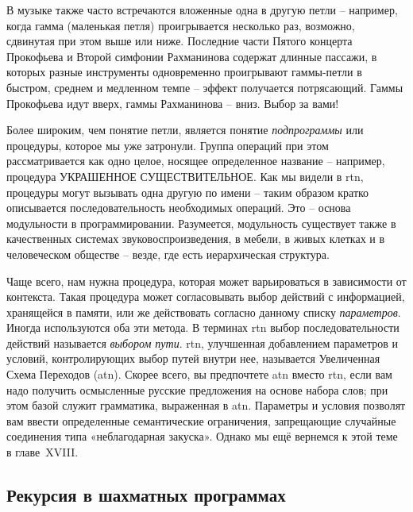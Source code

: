 \documentclass[../main.tex]{subfiles}
\begin{document}
В музыке также часто встречаются вложенные одна в другую петли \--- например, когда гамма (маленькая петля) проигрывается несколько раз, возможно, сдвинутая при этом выше или ниже. Последние части Пятого концерта Прокофьева и Второй симфонии Рахманинова содержат длинные пассажи, в которых разные инструменты одновременно проигрывают гаммы-петли в быстром, среднем и медленном темпе \--- эффект получается потрясающий. Гаммы Прокофьева идут вверх, гаммы Рахманинова \--- вниз. Выбор за вами!

Более широким, чем понятие петли, является понятие \emph{подпрограммы} или процедуры, которое мы уже затронули. Группа операций при этом рассматривается как одно целое, носящее определенное название \--- например, процедура УКРАШЕННОЕ СУЩЕСТВИТЕЛЬНОЕ\@. Как мы видели в \acs{rtn}, процедуры могут вызывать одна другую по имени \--- таким образом кратко описывается последовательность необходимых операций. Это \--- основа модульности в программировании. Разумеется, модульность существует также в качественных системах звуковоспроизведения, в мебели, в живых клетках и в человеческом обществе \--- везде, где есть иерархическая структура.

Чаще всего, нам нужна процедура, которая может варьироваться в зависимости от контекста. Такая процедура может согласовывать выбор действий с информацией, хранящейся в памяти, или же действовать согласно данному списку \emph{параметров}. Иногда используются оба эти метода. В терминах \acs{rtn} выбор последовательности действий называется \emph{выбором пути}. \Acs{rtn}, улучшенная добавлением параметров и условий, контролирующих выбор путей внутри нее, называется Увеличенная Схема Переходов (\acs{atn}). Скорее всего, вы предпочтете \acs{atn} вместо \acs{rtn}, если вам надо получить осмысленные русские предложения на основе набора слов; при этом базой служит грамматика, выраженная в \acs{atn}\@. Параметры и условия позволят вам ввести определенные семантические ограничения, запрещающие случайные соединения типа «неблагодарная закуска». Однако мы ещё вернемся к этой теме в главе~XVIII.


\subsection{Рекурсия в шахматных программах}
\end{document}
